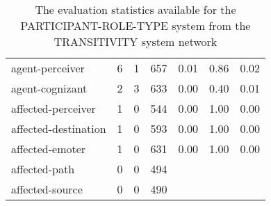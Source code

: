 \begin{table}[!b]
{\begin{tabulary}{1.1\textwidth}{@{}lCCCccc@{}}
        agent-perceiver & 6 & 1 & 657 & 0.01 & 0.86 & 0.02 \\
        agent-cognizant & 2 & 3 & 633 & 0.00 & 0.40 & 0.01 \\
        affected-perceiver & 1 & 0 & 544 & 0.00 & 1.00 & 0.00 \\
        affected-destination & 1 & 0 & 593 & 0.00 & 1.00 & 0.00 \\
        affected-emoter & 1 & 0 & 631 & 0.00 & 1.00 & 0.00 \\
        affected-path & 0 & 0 & 494 &  &  &  \\
        affected-source & 0 & 0 & 490 &  &  & \\ 
        \bottomrule
        \end{tabulary}
    }
    \caption{The evaluation statistics available for the PARTICIPANT-ROLE-TYPE system from the TRANSITIVITY system network}
    \label{tab:features-participant-role}
    \end{table}